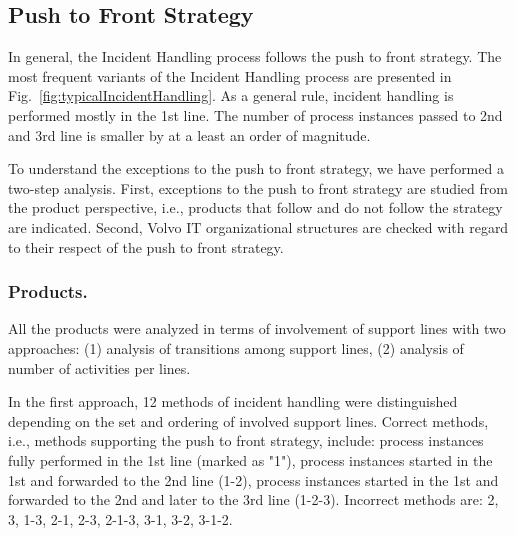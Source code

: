 \documentclass[lnbip]{svmultln}
\begin{document}
\subsection{Push to Front Strategy}

In general, the Incident Handling process follows the push to front strategy. The most frequent variants of the Incident Handling process are presented in Fig.~\ref{fig:typicalIncidentHandling}. 
As a general rule, incident handling is performed mostly in the 1st line. The number of process instances passed to 2nd and 3rd line is smaller by at a least an order of magnitude.

To understand the exceptions to the push to front strategy, we have performed a two-step analysis. First, exceptions to the push to front strategy are studied from the product perspective, i.e., products that follow and do not follow the strategy are indicated. Second, Volvo IT organizational structures are checked with regard to their respect of the push to front strategy.

\subsubsection{Products.} All the products were analyzed in terms of involvement of support lines with two approaches: (1) analysis of transitions among support lines, (2) analysis of number of activities per lines. 

In the first approach, 12 methods of incident handling were distinguished depending on the set and ordering of involved support lines. Correct methods, i.e., methods supporting the push to front strategy,  include: process instances fully performed in the 1st line (marked as "1"), process instances started in the 1st and forwarded to the 2nd line (1-2), process instances started in the 1st and forwarded to the 2nd and later to the 3rd line (1-2-3). Incorrect methods are: 2, 3, 1-3, 2-1, 2-3, 2-1-3, 3-1, 3-2, 3-1-2.
\end{document}
